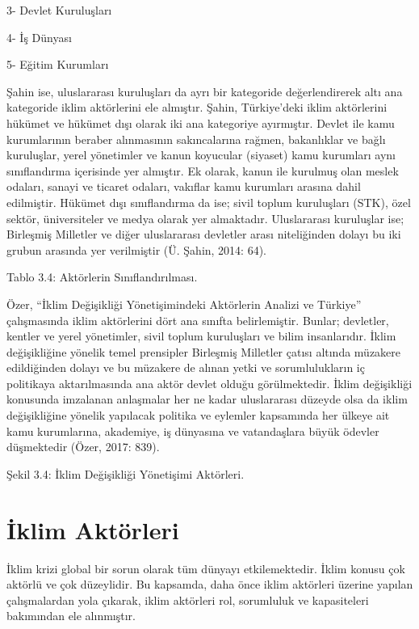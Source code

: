\documentclass[
]{book}
\begin{document}
3- Devlet Kuruluşları

4- İş Dünyası

5- Eğitim Kurumları

Şahin ise, uluslararası kuruluşları da ayrı bir kategoride değerlendirerek altı ana kategoride iklim aktörlerini ele almıştır. Şahin, Türkiye'deki iklim aktörlerini hükümet ve hükümet dışı olarak iki ana kategoriye ayırmıştır. Devlet ile kamu kurumlarının beraber alınmasının sakıncalarına rağmen, bakanlıklar ve bağlı kuruluşlar, yerel yönetimler ve kanun koyucular (siyaset) kamu kurumları aynı sınıflandırma içerisinde yer almıştır. Ek olarak, kanun ile kurulmuş olan meslek odaları, sanayi ve ticaret odaları, vakıflar kamu kurumları arasına dahil edilmiştir. Hükümet dışı sınıflandırma da ise; sivil toplum kuruluşları (STK), özel sektör, üniversiteler ve medya olarak yer almaktadır. Uluslararası kuruluşlar ise; Birleşmiş Milletler ve diğer uluslararası devletler arası niteliğinden dolayı bu iki grubun arasında yer verilmiştir (Ü. Şahin, 2014: 64).

Tablo 3.4: Aktörlerin Sınıflandırılması.

Özer, ``İklim Değişikliği Yönetişimindeki Aktörlerin Analizi ve Türkiye'' çalışmasında iklim aktörlerini dört ana sınıfta belirlemiştir. Bunlar; devletler, kentler ve yerel yönetimler, sivil toplum kuruluşları ve bilim insanlarıdır. İklim değişikliğine yönelik temel prensipler Birleşmiş Milletler çatısı altında müzakere edildiğinden dolayı ve bu müzakere de alınan yetki ve sorumlulukların iç politikaya aktarılmasında ana aktör devlet olduğu görülmektedir. İklim değişikliği konusunda imzalanan anlaşmalar her ne kadar uluslararası düzeyde olsa da iklim değişikliğine yönelik yapılacak politika ve eylemler kapsamında her ülkeye ait kamu kurumlarına, akademiye, iş dünyasına ve vatandaşlara büyük ödevler düşmektedir (Özer, 2017: 839).

Şekil 3.4: İklim Değişikliği Yönetişimi Aktörleri.

\hypertarget{iklim-aktuxf6rleri}{%
\section{İklim Aktörleri}\label{iklim-aktuxf6rleri}}

İklim krizi global bir sorun olarak tüm dünyayı etkilemektedir. İklim konusu çok aktörlü ve çok düzeylidir. Bu kapsamda, daha önce iklim aktörleri üzerine yapılan çalışmalardan yola çıkarak, iklim aktörleri rol, sorumluluk ve kapasiteleri bakımından ele alınmıştır.
\end{document}
